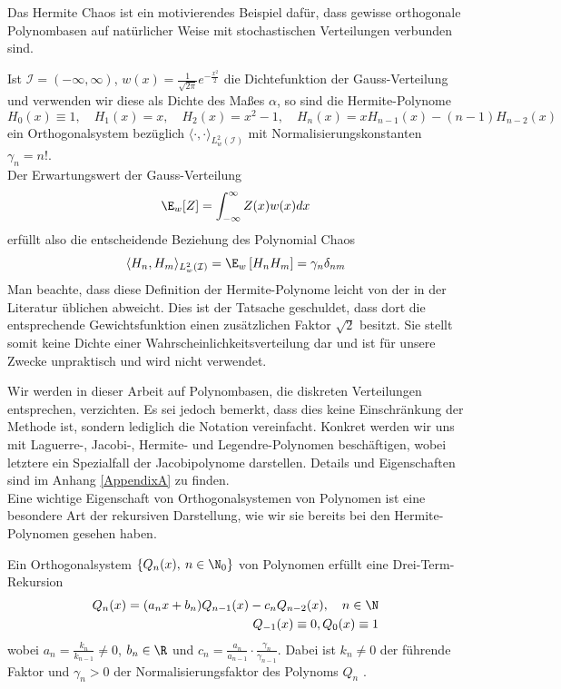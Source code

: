 Das Hermite Chaos ist ein motivierendes Beispiel dafür, dass gewisse orthogonale Polynombasen auf natürlicher Weise mit stochastischen Verteilungen verbunden sind.
\begin{mathbsp}
\label{bsp:hermitechaos}
Ist $\mathcal{I}=(-\infty,\infty)$, $w(x)=\frac{1}{\sqrt{2\pi}}e^{-\frac{x^2}{2}}$ die Dichtefunktion der Gauss-Verteilung und verwenden wir diese als Dichte des Maßes $\alpha$, so sind die Hermite-Polynome
\[H_0(x)\equiv 1,\quad H_1(x)=x,\quad H_2(x)=x^2-1,\quad H_n(x)=xH_{n-1}(x)-(n-1)H_{n-2}(x)\]
ein Orthogonalsystem bezüglich $\langle\cdot,\cdot\rangle_{L_w^2(\mathcal{I})}$ mit Normalisierungskonstanten $\gamma_n=n!$.\\
Der Erwartungswert der Gauss-Verteilung
\[\E_w[Z]= \int_{-\infty}^\infty Z(x)w(x)dx\] erfüllt also die entscheidende Beziehung des Polynomial Chaos
\[\langle H_n,H_m\rangle_{L_w^2(\mathcal{I})} =\E_w \left[H_nH_m\right]=\gamma_n\delta_{nm}\]
Man beachte, dass diese Definition der Hermite-Polynome leicht von der in der Literatur üblichen abweicht. Dies ist der Tatsache geschuldet, dass dort die entsprechende Gewichtsfunktion einen zusätzlichen Faktor $\sqrt{2}$ besitzt. Sie stellt somit keine Dichte einer Wahrscheinlichkeitsverteilung dar und ist für unsere Zwecke unpraktisch und wird nicht verwendet. 
\end{mathbsp}
Wir werden in dieser Arbeit auf Polynombasen, die diskreten Verteilungen entsprechen, verzichten. Es sei jedoch bemerkt, dass dies keine Einschränkung der Methode ist, sondern lediglich die Notation vereinfacht. Konkret werden wir uns mit Laguerre-, Jacobi-, Hermite- und Legendre-Polynomen beschäftigen, wobei letztere ein Spezialfall der Jacobipolynome darstellen. Details und Eigenschaften sind im Anhang \ref{AppendixA} zu finden.\\[0.3cm]
Eine wichtige Eigenschaft von Orthogonalsystemen von Polynomen ist eine besondere Art der rekursiven Darstellung, wie wir sie bereits bei den Hermite-Polynomen gesehen haben.
\begin{maththeorem}
\label{threetermexist}
Ein Orthogonalsystem $\left\lbrace Q_n(x),\: n\in\N_0\right\rbrace$ von Polynomen erfüllt eine Drei-Term-Rekursion
\begin{eqnarray}
Q_n(x)=(a_nx+b_n)Q_{n-1}(x)-c_nQ_{n-2}(x),\quad n\in\N\\
Q_{-1}(x)\equiv 0, Q_0(x)\equiv 1\nonumber
\end{eqnarray}
wobei $a_n=\frac{k_n}{k_{n-1}}\neq 0$, $b_n\in\R$ und $c_n=\frac{a_n}{a_{n-1}}\cdot \frac{\gamma_n}{\gamma_{n-1}}$.
Dabei ist $k_n\neq 0$ der führende Faktor und $\gamma_n>0$ der Normalisierungsfaktor des Polynoms $Q_n$ . 
\end{maththeorem}
